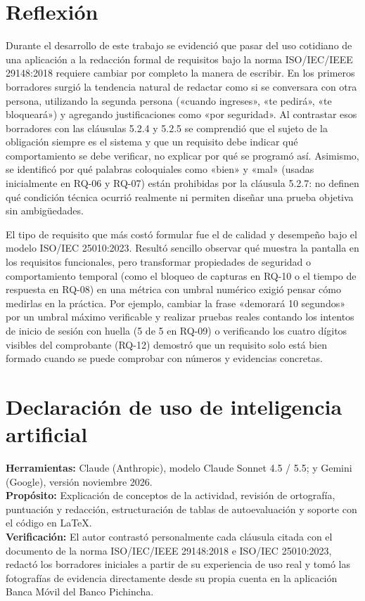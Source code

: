 \documentclass[11pt,a4paper]{article}
\begin{document}
\section{Reflexión}
\label{sec:reflexion}
Durante el desarrollo de este trabajo se evidenció que pasar del uso cotidiano de una aplicación a la redacción formal de requisitos bajo la norma ISO/IEC/IEEE 29148:2018 requiere cambiar por completo la manera de escribir. En los primeros borradores surgió la tendencia natural de redactar como si se conversara con otra persona, utilizando la segunda persona («cuando ingreses», «te pedirá», «te bloqueará») y agregando justificaciones como «por seguridad». Al contrastar esos borradores con las cláusulas 5.2.4 y 5.2.5 se comprendió que el sujeto de la obligación siempre es el sistema y que un requisito debe indicar qué comportamiento se debe verificar, no explicar por qué se programó así. Asimismo, se identificó por qué palabras coloquiales como «bien» y «mal» (usadas inicialmente en RQ-06 y RQ-07) están prohibidas por la cláusula 5.2.7: no definen qué condición técnica ocurrió realmente ni permiten diseñar una prueba objetiva sin ambigüedades.

El tipo de requisito que más costó formular fue el de calidad y desempeño bajo el modelo ISO/IEC 25010:2023. Resultó sencillo observar qué muestra la pantalla en los requisitos funcionales, pero transformar propiedades de seguridad o comportamiento temporal (como el bloqueo de capturas en RQ-10 o el tiempo de respuesta en RQ-08) en una métrica con umbral numérico exigió pensar cómo medirlas en la práctica. Por ejemplo, cambiar la frase «demorará 10 segundos» por un umbral máximo verificable y realizar pruebas reales contando los intentos de inicio de sesión con huella (5 de 5 en RQ-09) o verificando los cuatro dígitos visibles del comprobante (RQ-12) demostró que un requisito solo está bien formado cuando se puede comprobar con números y evidencias concretas.

\section*{Declaración de uso de inteligencia artificial}
\textbf{Herramientas:} Claude (Anthropic), modelo Claude Sonnet 4.5 / 5.5; y Gemini (Google), versión noviembre 2026.\\
\textbf{Propósito:} Explicación de conceptos de la actividad, revisión de ortografía, puntuación y redacción, estructuración de tablas de autoevaluación y soporte con el código en \LaTeX{}.\\
\textbf{Verificación:} El autor contrastó personalmente cada cláusula citada con el documento de la norma ISO/IEC/IEEE 29148:2018 e ISO/IEC 25010:2023, redactó los borradores iniciales a partir de su experiencia de uso real y tomó las fotografías de evidencia directamente desde su propia cuenta en la aplicación Banca Móvil del Banco Pichincha.



\end{document}
